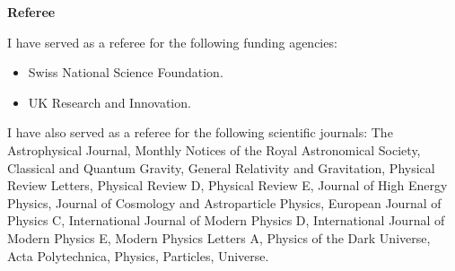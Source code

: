 \documentclass[11pt]{article}
\newcommand{\blankline}{\quad\pagebreak[3]}
\begin{document}
\textbf{Referee}

I have served as a referee for the following funding agencies:
%
\begin{itemize}
    \item Swiss National Science Foundation.
    \item UK Research and Innovation.
\end{itemize}

\blankline

\quad I have also served as a referee for the following scientific journals:
The Astrophysical Journal,
Monthly Notices of the Royal Astronomical Society,
Classical and Quantum Gravity,
General Relativity and Gravitation,
Physical Review Letters,
Physical Review D,
Physical Review E,
Journal of High Energy Physics,
Journal of Cosmology and Astroparticle Physics,
European Journal of Physics C,
International Journal of Modern Physics D,
International Journal of Modern Physics E,
Modern Physics Letters A,
Physics of the Dark Universe,
Acta Polytechnica,
Physics,
Particles,
Universe.
\end{document}

